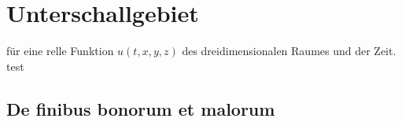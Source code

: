 %
%
%
%
\section{Unterschallgebiet\label{ueberschall:unterschallgebiet}}

für eine relle Funktion $u(t,x,y,z)$ des dreidimensionalen Raumes und der Zeit.
test

\subsection{De finibus bonorum et 
malorum\label{ueberschall:subsection:finibus}}

